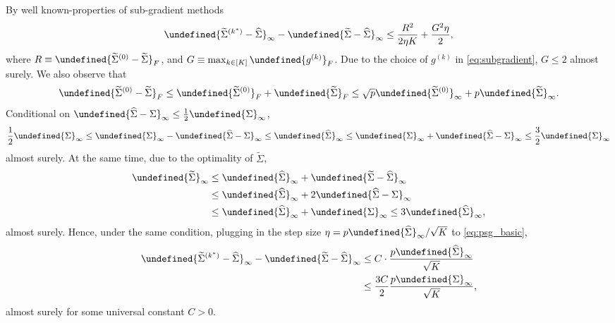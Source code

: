 \documentclass[10pt,a4paper]{amsart}
\theoremstyle{plain}
\theoremstyle{remark}
\newcommand{\tr}{\operatorname{tr}}
\def\hat#1{\widehat{#1}}
\def\tilde#1{\widetilde{#1}}
\let\norm\undefined %
\DeclarePairedDelimiter\norm{\lVert}{\rVert}
\begin{document}
By well known-properties of sub-gradient methods 
\begin{equation} \label{eq:psg_basic}
    \norm{\tilde\Sigma^{(k^*)} - \hat\Sigma}_\infty - \norm{\tilde\Sigma - \hat\Sigma}_\infty 
    \leq \frac{R^2}{2 \eta K} + \frac{G^2 \eta}{2},
\end{equation}
where $R \equiv \norm{\tilde\Sigma^{(0)} - \tilde\Sigma}_F$, and $G \equiv \max_{k \in [K]} \norm{g^{(k)}}_F$. Due to the choice of $g^{(k)}$ in \cref{eq:subgradient}, $G \leq 2$ almost surely. 
%
We also observe that
\begin{equation*}
    \norm{\tilde\Sigma^{(0)} - \tilde\Sigma}_F
    \leq \norm{\tilde\Sigma^{(0)}}_F + \norm{\tilde\Sigma}_F
    \leq \sqrt{p} \norm{\tilde\Sigma^{(0)}}_\infty + p \norm{\tilde\Sigma}_\infty.
\end{equation*}
Conditional on $\norm{\hat\Sigma - \Sigma}_\infty \leq \frac{1}{2} \norm{\Sigma}_\infty$, 
\begin{equation*}
\begin{aligned}
    \frac{1}{2} \norm{\Sigma}_\infty
    \leq \norm{\Sigma}_\infty - \norm{\hat\Sigma - \Sigma}_\infty
    \leq \norm{\hat\Sigma}_\infty 
    \leq \norm{\Sigma}_\infty + \norm{\hat\Sigma - \Sigma}_\infty
    \leq \frac{3}{2} \norm{\Sigma}_\infty 
\end{aligned}
\end{equation*}
almost surely. At the same time, due to the optimality of $\tilde\Sigma$,
\begin{equation*}
\begin{aligned}
    \norm{\tilde\Sigma}_\infty 
    & \leq \norm{\hat\Sigma}_\infty + \norm{\tilde\Sigma - \hat\Sigma}_\infty \\
    & \leq \norm{\hat\Sigma}_\infty + 2 \norm{\hat\Sigma - \Sigma}_\infty \\
    & \leq \norm{\hat\Sigma}_\infty + \norm{\Sigma}_\infty
    \leq 3 \norm{\hat\Sigma}_\infty,
\end{aligned}
\end{equation*}
almost surely. Hence, under the same condition, plugging in the step size $\eta = p\norm{\hat\Sigma}_\infty / \sqrt{K}$ to \cref{eq:psg_basic},
\begin{equation*}
\begin{aligned}
    \norm{\tilde\Sigma^{(k^*)} - \hat\Sigma}_\infty - \norm{\tilde\Sigma - \hat\Sigma}_\infty 
    & \leq C \cdot \frac{p \norm{\hat\Sigma}_\infty}{\sqrt{K}} \\
    & \leq \frac{3C}{2} \frac{p \norm{\Sigma}_\infty}{\sqrt{K}},
\end{aligned}
\end{equation*}
almost surely for some universal constant $C > 0$.
\end{document}
